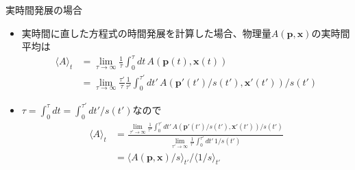 
\begin{frame}[t,fragile]{実時間発展の場合}
  \begin{itemize}
  \item 実時間に直した方程式の時間発展を計算した場合、物理量$A(\mathbf{p},\mathbf{x})$の実時間平均は
    \begin{align*}
      \langle A \rangle_t &= \lim_{\tau\rightarrow\infty} \frac{1}{\tau} \int_0^\tau dt \, A(\mathbf{p}(t),\mathbf{x}(t)) \\
      &= \lim_{\tau\rightarrow\infty} \frac{\tau'}{\tau} \frac{1}{\tau'} \int_0^{\tau'} dt' \, A(\mathbf{p}'(t')/s(t'),\mathbf{x}'(t')) / s(t')
    \end{align*}
  \item $\tau = \int_0^{\tau} dt = \int_0^{\tau'} dt'/s(t')$なので
    \begin{align*}
      \langle A \rangle_t &= \frac{\lim_{\tau'\rightarrow\infty} \frac{1}{\tau'} \int_0^{\tau'} dt' \, A(\mathbf{p}'(t')/s(t'),\mathbf{x}'(t')) / s(t')}{\lim_{\tau'\rightarrow\infty} \frac{1}{\tau'} \int_0^{\tau'} dt' \, 1/ s(t')} \\
      &= \langle A(\mathbf{p},\mathbf{x}) / s \rangle_{t'} / \langle 1 / s \rangle_{t'}
    \end{align*}
  \end{itemize}
\end{frame}
